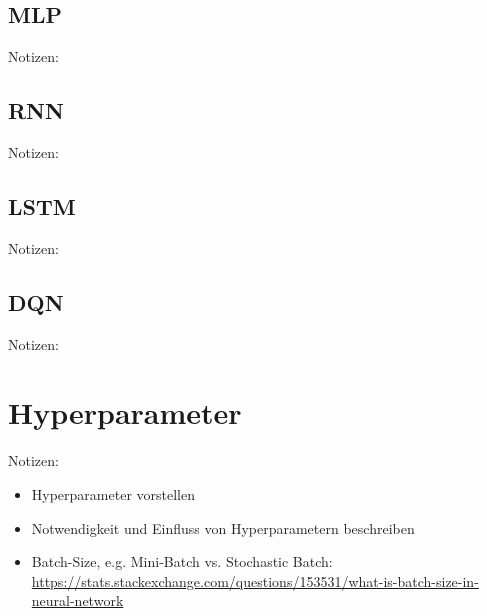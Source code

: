 \subsection{MLP}
Notizen:


\subsection{RNN}
Notizen:


\subsection{LSTM}
Notizen:


\subsection{DQN}
Notizen:


\section{Hyperparameter}
Notizen:
\begin{itemize}
	\item Hyperparameter vorstellen
	\item Notwendigkeit und Einfluss von Hyperparametern beschreiben
	\item Batch-Size, e.g. Mini-Batch vs. Stochastic Batch: \url{https://stats.stackexchange.com/questions/153531/what-is-batch-size-in-neural-network}
\end{itemize}
